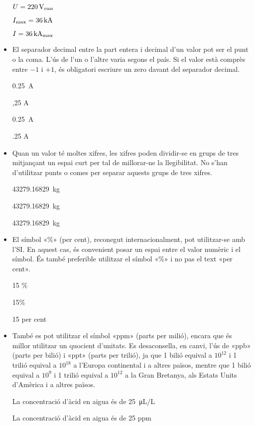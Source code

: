 \begin{itemize}
\textcolor{Red}\faTimesCircle{} $U = \qty{220}{V\ensuremath{_\mathrm{rms}}}$

\textcolor{Green}\faCheckSquare{}  $I_\mathrm{max} = \qty{36}{kA}$

\textcolor{Red}\faTimesCircle{}   $I = \qty{36}{kA\ensuremath{_\mathrm{max}}}$


\item El separador decimal entre la part entera i decimal d'un valor pot ser el punt o la coma. L'ús de l'un o l'altre varia segons el país. Si el valor està comprès entre $-1$ i $+1$, és obligatori escriure un zero davant del separador decimal.

\textcolor{Green}\faCheckSquare{} \qty{0,25}{A}

\textcolor{Red}\faTimesCircle{}  ,25 A

\textcolor{Green}\faCheckSquare{} \qty[output-decimal-marker = {.}]{0.25}{A}

\textcolor{Red}\faTimesCircle{}  .25 A


\item Quan un valor té moltes xifres, les xifres poden dividir-se en grups de tres mitjançant un espai curt per tal de millorar-ne la llegibilitat. No s'han d'utilitzar punts o comes per separar aquests grups de tres xifres.

\textcolor{Green}\faCheckSquare{} \qty{43279,16829}{kg}

\textcolor{Green}\faCheckSquare{} \qty[group-separator =]{43279,16829}{kg}

\textcolor{Red}\faTimesCircle{}  \qty[group-separator = .]{43279,16829}{kg}

\item El símbol «\%» (per cent), reconegut internacionalment, pot utilitzar-se amb l'SI. En aquest cas, és convenient posar un espai entre el valor numèric i el símbol. És també preferible utilitzar el símbol «\%» i no pas el text  «per cent».

\textcolor{Green}\faCheckSquare{} 15 \%

\textcolor{Blue}\faExclamationTriangle{} 15\%

\textcolor{Blue}\faExclamationTriangle{} 15 per cent


\item També es pot utilitzar el símbol «ppm» (parts per milió), encara que és millor utilitzar un quocient d'unitats. Es desaconsella, en canvi, l'ús de «ppb» (parts per bilió) i «ppt» (parts per trilió), ja que 1 bilió equival a $10^{12}$ i 1 trilió equival a $10^{18}$ a l'Europa continental i a altres països, mentre que 1 bilió equival a $10^{9}$ i 1 trilió equival a $10^{12}$ a la Gran Bretanya, als Estats Units d'Amèrica i a altres països.

\textcolor{Green}\faCheckSquare{} La concentració d'àcid en aigua és de \qty{25}{\micro L/L}

\textcolor{Blue}\faExclamationTriangle{} La concentració d'àcid en aigua és de 25 ppm

\end{itemize}


